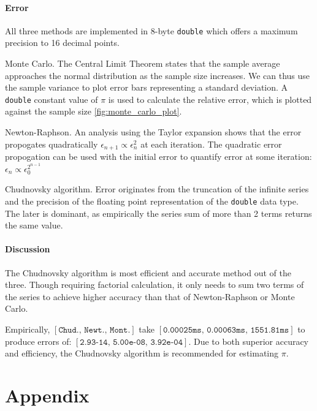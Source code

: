 \documentclass[11pt]{article}
\begin{document}
\paragraph{Error}
All three methods are implemented in 8-byte \texttt{double} which offers a maximum precision to
16 decimal points.
\par{Monte Carlo.} The Central Limit Theorem states that the sample average approaches the normal distribution as
the sample size increases. We can thus use the sample variance to plot error bars representing
a standard deviation. A \texttt{double} constant value of $\pi$ is used to calculate the relative error, which is
plotted against the sample size \ref{fig:monte_carlo_plot}.
\par{Newton-Raphson.} An analysis using the Taylor expansion shows that the error propogates quadratically $\epsilon_{n+1}\propto \epsilon_n^2$
at each iteration. The quadratic error propogation can be used with the initial error to quantify error at some iteration: $\epsilon_{n} \propto \epsilon_{0}^{2^{n-1}}$
\par{Chudnovsky algorithm.} Error originates from the truncation of the infinite series and the precision of the floating point 
representation of the \texttt{double} data type. The later is dominant, as empirically the series sum of more than 2 terms
returns the same value.

\paragraph{Discussion} The Chudnovsky algorithm is most efficient and accurate method out of the three. Though requiring 
factorial calculation, it only needs to sum two terms of the series to achieve
higher accuracy than that of Newton-Raphson or Monte Carlo.
\par Empirically, $[\texttt{Chud., Newt., Mont.}]$
take $[\texttt{0.00025ms, 0.00063ms, 1551.81ms}]$ to produce errors of: $[\texttt{2.93-14, 5.00e-08, 3.92e-04}]$.
Due to both superior accuracy and efficiency, the Chudnovsky algorithm is recommended for estimating $\pi$.

\newpage
\thispagestyle{empty}
\section*{Appendix}
\end{document}
